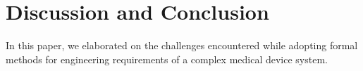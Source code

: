 \section{Discussion and Conclusion}
\label{sec:conclusion}

In this paper, we elaborated on the challenges encountered while adopting formal methods for engineering requirements of a complex medical device system.
